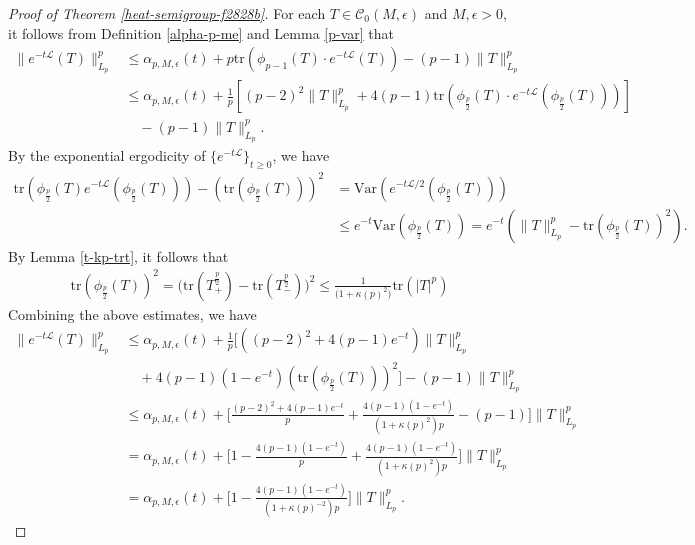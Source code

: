 \documentclass{amsbook}
\theoremstyle{definition}
\theoremstyle{remark}
\numberwithin{section}{chapter}
\numberwithin{equation}{chapter}
\newcommand{\1}{\mathbf{1}}
\begin{document}
\begin{proof}[Proof of Theorem \ref{heat-semigroup-f2828b}]
For each $T\in \mathcal{C}_0(M,\epsilon)$ and $M,\epsilon>0$, it follows from Definition \ref{alpha-p-me} and Lemma \ref{p-var} that
\begin{equation*}\label{tr-etp}
\begin{aligned}
\|e^{-t\mathcal{L}}(T)\|^{p}_{L_{p}}&\leq \alpha_{p,M,\epsilon}(t)+p\mathrm{tr}(\phi_{p-1}(T)\cdot e^{-t\mathcal L}(T))-(p-1)\|T\|^{p}_{L_{p}}\\
&\leq\alpha_{p,M,\epsilon}(t)+\frac{1}{p}\left[(p-2)^2\|T\|^{p}_{L_{p}}+4(p-1)\mathrm{tr}(\phi_{\frac{p}{2}}(T)\cdot e^{-t\mathcal L}(\phi_{\frac{p}{2}}(T)))\right]\\
&\quad-(p-1)\|T\|^{p}_{L_{p}}.
\end{aligned}
\end{equation*}
By the exponential ergodicity of $\{e^{-t\mathcal{L}}\}_{t\geq 0}$, we have
\begin{align*}
\mathrm{tr}(\phi_{\frac{p}{2}}(T)e^{-t\mathcal L}(\phi_{\frac{p}{2}}(T)))-(\mathrm{tr}(\phi_{\frac p2}(T)))^2&=\mathrm{Var}\left(e^{-t\mathcal{L}/2}(\phi_{\frac{p}{2}}(T))\right)\\
&\leq e^{-t}\mathrm{Var}(\phi_{\frac{p}{2}}(T))=e^{-t}\left(\|T\|^{p}_{L_{p}}-\mathrm{tr}(\phi_{\frac{p}{2}}(T))^{2}\right).
\end{align*}
By Lemma \ref{t-kp-trt}, it follows that 
\begin{align*}
\mathrm{tr}(\phi_{\frac{p}{2}}(T))^{2}=\big(\mathrm{tr}(T_+^{\frac{p}{2}})-\mathrm{tr}(T_-^{\frac{p}{2}})\big)^2\leq \frac{1}{\bigl(1 + \kappa(p)^2\bigr)}\mathrm{tr}(|T|^p)
\end{align*}
Combining the above estimates, we have
\begin{equation*}\label{k-1}
\begin{aligned}
\|e^{-t\mathcal{L}}(T)\|^{p}_{L_{p}}&\leq \alpha_{p,M,\epsilon}(t)+\frac1p\big[\left((p-2)^2+4(p-1)e^{-t}\right)\|T\|^{p}_{L_{p}}\\
	&\quad+4(p-1)(1-e^{-t})(\mathrm{tr}(\phi_{\frac p2}(T)))^2\big]-(p-1)\|T\|^{p}_{L_{p}}\\
&\leq \alpha_{p,M,\epsilon}(t)+\Big[\frac{(p-2)^2+4(p-1)e^{-t}}{p}+\frac{4(p-1)(1-e^{-t})}{(1+\kappa(p)^2)p}-(p-1)\Big]\|T\|^{p}_{L_{p}}\\
	&=\alpha_{p,M,\epsilon}(t)+\Big[1-\frac{4(p-1)(1-e^{-t})}{p}+\frac{4(p-1)(1-e^{-t})}{(1+\kappa(p)^2)p}\Big]\|T\|^{p}_{L_{p}}\\
	&=\alpha_{p,M,\epsilon}(t)+\Big[1-\frac{4(p-1)(1-e^{-t})}{(1+\kappa(p)^{-2})p}\Big]\|T\|^{p}_{L_{p}}.
\end{aligned}

\end{equation*}
\end{proof}
\end{document}
